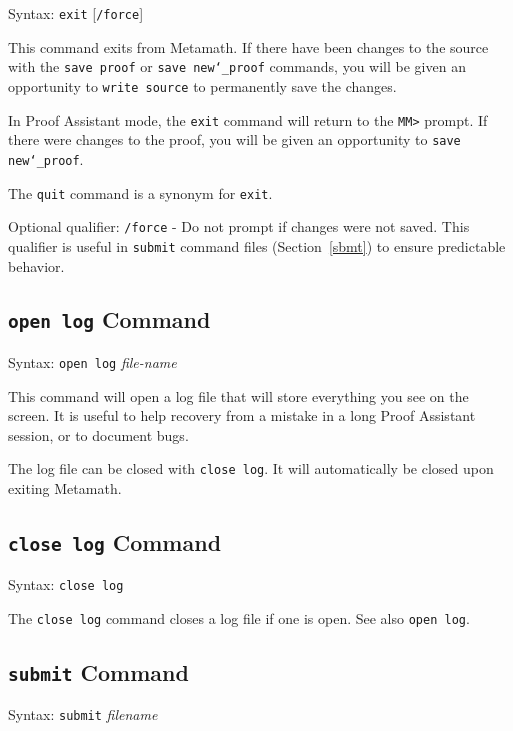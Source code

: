 Syntax:  \texttt{exit} [\texttt{/force}]

This command exits from Metamath.  If there have been changes to the
source with the \texttt{save proof} or \texttt{save new{\char`\_}proof}
commands, you will be given an opportunity to \texttt{write source} to
permanently save the changes.

In Proof Assistant mode, the \texttt{exit} command will
return to the \verb/MM>/ prompt. If there were changes to the proof, you will
be given an opportunity to \texttt{save new{\char`\_}proof}.

The \texttt{quit} command is a synonym for \texttt{exit}.

Optional qualifier:
    \texttt{/force} - Do not prompt if changes were not saved.  This qualifier is
        useful in \texttt{submit} command files (Section~\ref{sbmt})
        to ensure predictable behavior.





\subsection{\texttt{open log} Command}
Syntax:  \texttt{open log} {\em file-name}

This command will open a log file that will store everything you see on
the screen.  It is useful to help recovery from a mistake in a long Proof
Assistant session, or to document bugs.

The log file can be closed with \texttt{close log}.  It will automatically be
closed upon exiting Metamath.



\subsection{\texttt{close log} Command}
Syntax:  \texttt{close log}

The \texttt{close log} command closes a log file if one is open.  See
also \texttt{open log}.




\subsection{\texttt{submit} Command}\label{sbmt}
Syntax:  \texttt{submit} {\em filename}

